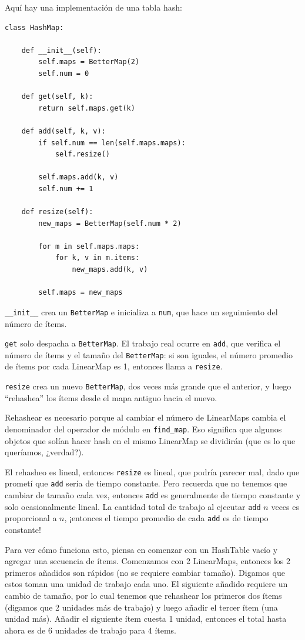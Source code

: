 \documentclass[10pt]{book}
\begin{document}
Aquí hay una implementación de una tabla hash:

\begin{verbatim}
class HashMap:

    def __init__(self):
        self.maps = BetterMap(2)
        self.num = 0

    def get(self, k):
        return self.maps.get(k)

    def add(self, k, v):
        if self.num == len(self.maps.maps):
            self.resize()

        self.maps.add(k, v)
        self.num += 1

    def resize(self):
        new_maps = BetterMap(self.num * 2)

        for m in self.maps.maps:
            for k, v in m.items:
                new_maps.add(k, v)

        self.maps = new_maps
\end{verbatim}

\verb"__init__" crea un {\tt BetterMap} e inicializa a {\tt num}, que hace un seguimiento del número de ítems.

{\tt get} solo despacha a {\tt BetterMap}.  El trabajo real ocurre
en {\tt add}, que verifica el número de ítems y el tamaño del
{\tt BetterMap}: si son iguales, el número promedio de ítems por cada
LinearMap es 1, entonces llama a {\tt resize}.

{\tt resize} crea un nuevo {\tt BetterMap}, dos veces más grande que el
anterior, y luego ``rehashea'' los ítems desde el mapa antiguo hacia el nuevo.

Rehashear es necesario porque al cambiar el número de LinearMaps
cambia el denominador del operador de módulo en
\verb"find_map".  Eso significa que algunos objetos que solían
hacer hash en el mismo LinearMap se dividirán (que es
lo que queríamos, ¿verdad?).

El rehasheo es lineal, entonces
{\tt resize} es lineal, que podría parecer mal, dado que prometí
que {\tt add} sería de tiempo constante.  Pero recuerda que
no tenemos que cambiar de tamaño cada vez, entonces {\tt add} es generalmente
de tiempo constante y solo ocasionalmente lineal.  La cantidad total
de trabajo al ejecutar {\tt add} $n$ veces es proporcional a $n$,
¡entonces el tiempo promedio de cada {\tt add} es de tiempo constante!

Para ver cómo funciona esto, piensa en comenzar con un
HashTable vacío y agregar una secuencia de ítems.  Comenzamos con 2 LinearMaps,
entonces los 2 primeros añadidos son rápidos (no se requiere cambiar tamaño).  Digamos
que estos toman una unidad de trabajo cada uno.  El siguiente añadido
requiere un cambio de tamaño, por lo cual tenemos que rehashear los primeros dos
ítems (digamos que 2 unidades más de trabajo) y luego
añadir el tercer ítem (una unidad más).  Añadir el siguiente ítem
cuesta 1 unidad, entonces el total hasta ahora es
de 6 unidades de trabajo para 4 ítems.
\end{document}
